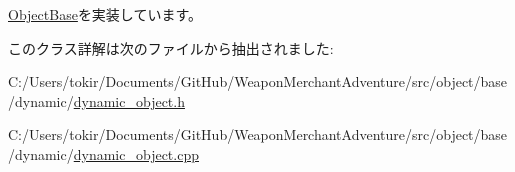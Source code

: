 \mbox{\hyperlink{class_object_base_aeac51d868beeb7f7fe900407b76b93a2}{Object\+Base}}を実装しています。



このクラス詳解は次のファイルから抽出されました\+:\begin{DoxyCompactItemize}
\item 
C\+:/\+Users/tokir/\+Documents/\+Git\+Hub/\+Weapon\+Merchant\+Adventure/src/object/base/dynamic/\mbox{\hyperlink{dynamic__object_8h}{dynamic\+\_\+object.\+h}}\item 
C\+:/\+Users/tokir/\+Documents/\+Git\+Hub/\+Weapon\+Merchant\+Adventure/src/object/base/dynamic/\mbox{\hyperlink{dynamic__object_8cpp}{dynamic\+\_\+object.\+cpp}}\end{DoxyCompactItemize}
